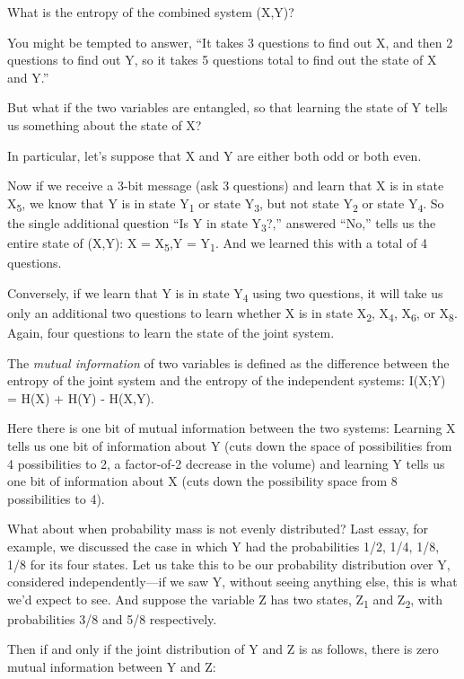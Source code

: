 {
 What is the entropy of the combined system (X,Y)?}

{
 You might be tempted to answer, ``It takes 3
questions to find out X, and then 2 questions to find out Y, so it
takes 5 questions total to find out the state of X and
Y.''}

{
 But what if the two variables are entangled, so that learning the
state of Y tells us something about the state of X?}

{
 In particular, let's suppose that X and Y are
either both odd or both even.}

{
 Now if we receive a 3-bit message (ask 3 questions) and learn that
X is in state X\textsubscript{5}, we know that Y is in state
Y\textsubscript{1} or state Y\textsubscript{3}, but not state
Y\textsubscript{2} or state Y\textsubscript{4}. So the single
additional question ``Is Y in state
Y\textsubscript{3}?,'' answered
``No,'' tells us the entire state of
(X,Y): X = X\textsubscript{5},Y = Y\textsubscript{1}. And we learned
this with a total of 4 questions.}

{
 Conversely, if we learn that Y is in state Y\textsubscript{4}
using two questions, it will take us only an additional two questions
to learn whether X is in state X\textsubscript{2}, X\textsubscript{4},
X\textsubscript{6}, or X\textsubscript{8}. Again, four questions to
learn the state of the joint system.}

{
 The \textit{mutual information} of two variables is defined as the
difference between the entropy of the joint system and the entropy of
the independent systems: I(X;Y) = H(X) + H(Y) - H(X,Y).}

{
 Here there is one bit of mutual information between the two
systems: Learning X tells us one bit of information about Y (cuts down
the space of possibilities from 4 possibilities to 2, a factor-of-2
decrease in the volume) and learning Y tells us one bit of information
about X (cuts down the possibility space from 8 possibilities to 4).}

{
 What about when probability mass is not evenly distributed? Last
essay, for example, we discussed the case in which Y had the
probabilities 1/2, 1/4, 1/8, 1/8 for its four states. Let us take this
to be our probability distribution over Y, considered
independently---if we saw Y, without seeing anything else, this is what
we'd expect to see. And suppose the variable Z has two
states, Z\textsubscript{1} and Z\textsubscript{2}, with probabilities
3/8 and 5/8 respectively.}

{
 Then if and only if the joint distribution of Y and Z is as
follows, there is zero mutual information between Y and Z:}

